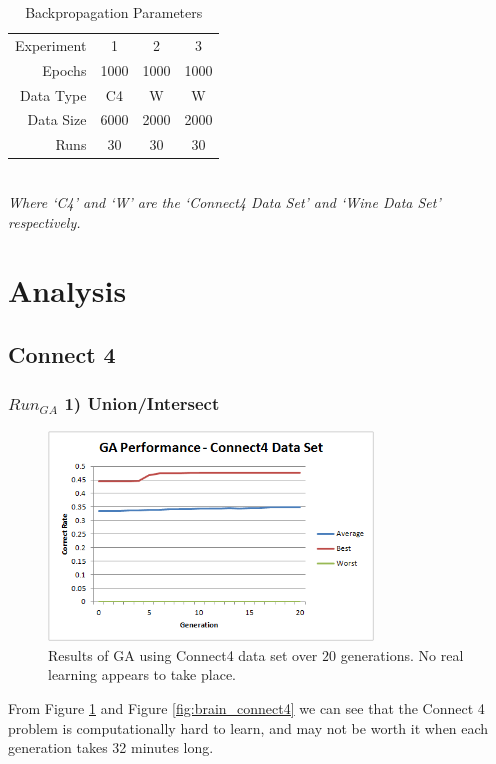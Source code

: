 \documentclass[journal]{IEEEtran}
\begin{document}
  \begin{table}[here]
    \renewcommand{\arraystretch}{1.3}
    \caption{Backpropagation Parameters}
    \label{E2}
    \centering
    \begin{tabular}{r|ccc}
  Experiment      & 1     & 2     & 3     \\
  Epochs          & 1000  & 1000  & 1000  \\
  Data Type       & C4    & W     & W     \\
  Data Size       & 6000  & 2000  & 2000  \\
  Runs            & 30    & 30    & 30    \\
    \end{tabular} \\
  \textit{Where `C4' and `W' are the `Connect4 Data Set' and `Wine Data Set' respectively.}
   \end{table}

\section{Analysis}
  \subsection{Connect 4}
    \subsubsection*{$Run_{GA}$ 1) Union/Intersect}
      \begin{figure}[here]%
        \centering
        \includegraphics[width=3.4in]{connect4_performance_new}
        \caption{Results of GA using Connect4 data set over $20$ generations. No real learning appears to take place.}
        \label{fig:connect4_performance_new}
      \end{figure}
      From Figure \ref{fig:connect4_performance_new} and Figure \ref{fig:brain_connect4}
    we can see that the Connect 4 problem is computationally hard to learn, and may not
    be worth it when each generation takes 32 minutes long.
\end{document}
